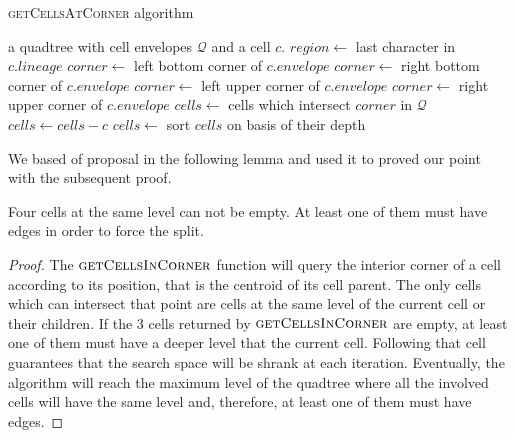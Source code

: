 \begin{algorithm} \caption{\textsc{getCellsAtCorner} algorithm}\label{alg:two}
    \begin{algorithmic}[1]
    \Require a quadtree with cell envelopes $\mathcal Q$ and a cell $c$.
        \State $region \gets $ last character in $c.lineage$
                \State $corner \gets$ left bottom corner of $c.envelope$
            \EndCase
                \State $corner \gets$ right bottom corner of $c.envelope$
            \EndCase
                \State $corner \gets$ left upper corner of $c.envelope$
            \EndCase
                \State $corner \gets$ right upper corner of $c.envelope$
            \EndCase
        \EndSwitch
        \State $cells \gets$ cells which intersect $corner$ in $\mathcal Q$
        \State $cells \gets cells - c$ 
        \State $cells \gets$ sort $cells$ on basis of their depth 
        \State {}
    \EndFunction
    \end{algorithmic}
\end{algorithm}

We based of proposal in the following lemma and used it to proved our point with the subsequent proof.

\begin{lemma}
Four cells at the same level can not be empty.  At least one of them must have edges in order to force the split.
\end{lemma}

\begin{proof}
The $\textsc{getCellsInCorner}$ function will query the interior corner of a cell according to its position, that is the centroid of its cell parent.  The only cells which can intersect that point are cells at the same level of the current cell or their children.  If the 3 cells returned by $\textsc{getCellsInCorner}$ are empty, at least one of them must have a deeper level that the current cell.  Following that cell guarantees that the search space will be shrank at each iteration.  Eventually, the algorithm will reach the maximum level of the quadtree where all the involved cells will have the same level and, therefore, at least one of them must have edges.
\end{proof}

